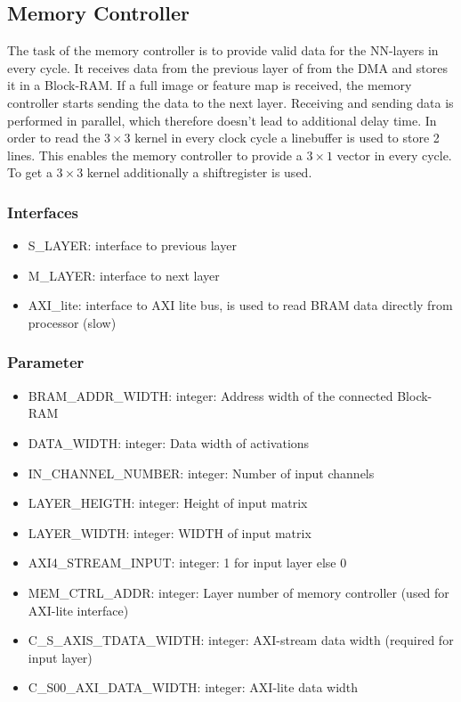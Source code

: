 \subsection{Memory Controller}
The task of the memory controller is to provide valid data for the NN-layers in every cycle. It receives data from the previous layer of from the DMA and stores it in a Block-RAM. If a full image or feature map is received, the memory controller starts sending the data to the next layer. Receiving and sending data is performed in parallel, which therefore doesn't lead to additional delay time.  In order to read the $3\times3$ kernel in every clock cycle a linebuffer is used to store 2 lines. This enables the memory controller to provide a $3\times1$ vector in every cycle. To get a $3\times3$ kernel additionally a shiftregister is used.  

\subsubsection{Interfaces}
\begin{itemize}
	\item S\_LAYER: interface to previous layer
	\item M\_LAYER: interface to next layer 
	\item AXI\_lite: interface to AXI lite bus, is used to read BRAM data directly from processor (slow)
\end{itemize}

\subsubsection{Parameter}
\begin{itemize}
	\item BRAM\_ADDR\_WIDTH: integer: Address width of the connected Block-RAM
	\item DATA\_WIDTH: integer: Data width of activations
	\item IN\_CHANNEL\_NUMBER: integer: Number of input channels 
	\item LAYER\_HEIGTH: integer: Height of input matrix 
	\item LAYER\_WIDTH: integer: WIDTH of input matrix 
	\item AXI4\_STREAM\_INPUT: integer: 1 for input layer else 0 
	\item MEM\_CTRL\_ADDR: integer: Layer number of memory controller (used for AXI-lite interface)
	\item C\_S\_AXIS\_TDATA\_WIDTH: integer: AXI-stream data width (required for input layer)
	\item C\_S00\_AXI\_DATA\_WIDTH: integer: AXI-lite data width 
\end{itemize}

